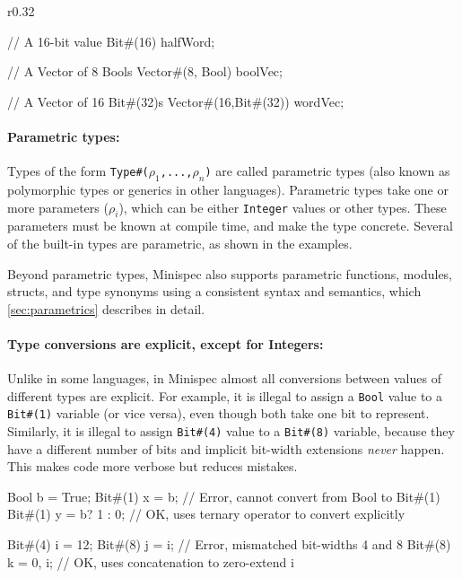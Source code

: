 \begin{wrapfigure}{r}{0.32\columnwidth}
\vspace{-2em}
\begin{mscode}
// A 16-bit value
Bit#(16) halfWord;

// A Vector of 8 Bools
Vector#(8, Bool) boolVec;

// A Vector of 16 Bit#(32)s
Vector#(16,Bit#(32)) wordVec;
\end{mscode}
\vspace{-2em}
\end{wrapfigure}

\paragraph{Parametric types:} Types of the form \texttt{Type\#($\rho_1$,...,$\rho_n$)} are called parametric types
(also known as polymorphic types or generics in other languages).
Parametric types take one or more parameters ($\rho_i$), which can be either \texttt{Integer} values or other types.
These parameters must be known at compile time, and make the type concrete.
Several of the built-in types are parametric, as shown in the examples.

Beyond parametric types, Minispec also supports parametric functions, modules, structs, and type synonyms
using a consistent syntax and semantics, which \autoref{sec:parametrics} describes in detail.

\paragraph{Type conversions are explicit, except for Integers:}
Unlike in some languages, in Minispec almost all conversions between values of different types are explicit.
For example, it is illegal to assign a \texttt{Bool} value to a \texttt{Bit\#(1)} variable (or vice versa),
even though both take one bit to represent.
Similarly, it is illegal to assign \texttt{Bit\#(4)} value to a \texttt{Bit\#(8)} variable, because they have a different number of bits
and implicit bit-width extensions \emph{never} happen.
This makes code more verbose but reduces mistakes.

\begin{mscode}
Bool b = True;
Bit#(1) x = b;         // Error, cannot convert from Bool to Bit#(1)
Bit#(1) y = b? 1 : 0;  // OK, uses ternary operator to convert explicitly

Bit#(4) i = 12;
Bit#(8) j = i;         // Error, mismatched bit-widths 4 and 8
Bit#(8) k = {0, i};    // OK, uses concatenation to zero-extend i
\end{mscode}

